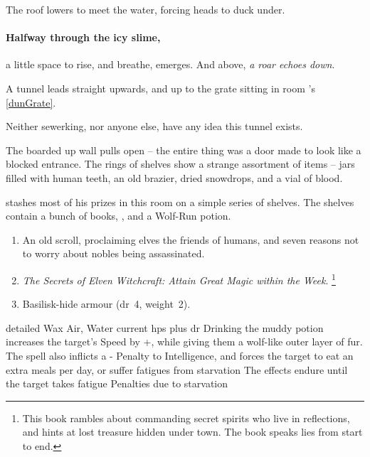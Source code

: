 The roof lowers to meet the water, forcing heads to duck under.

\paragraph{Halfway through the icy slime,}
a little space to rise, and breathe, emerges.
And above, \emph{a roar echoes down}.

A tunnel leads straight upwards, and up to the grate sitting in room 's \vref{dunGrate}.

Neither \gls{sewerking}, nor anyone else, have any idea this tunnel exists.

\begin{boxtext}
  The boarded up wall pulls open -- the entire thing was a door made to look like a blocked entrance.
  The rings of shelves show a strange assortment of items -- jars filled with human teeth, an old brazier, dried snowdrops, and a vial of blood.
\end{boxtext}


 stashes most of his prizes in this room on a simple series of shelves.
The shelves contain a bunch of books, \lootMagic, and a Wolf-Run potion.

\begin{enumerate}
  \item
  An old scroll, proclaiming elves the friends of humans, and seven reasons not to worry about nobles being assassinated.
  \item
  \textit{The Secrets of Elven Witchcraft: Attain Great Magic within the Week}.%
  \footnote{This book rambles about commanding secret spirits who live in reflections, and hints at lost treasure hidden under \gls{town}.
  The book speaks lies from start to end.}
  \item
  Basilisk-hide armour (\gls{dr}~4, \gls{weight}~2).
\end{enumerate}

\showTalisman

  {detailed}%
  {Wax}%
  {Air, Water}%
  {current \glspl{hp} plus \gls{dr}}%
  {Drinking the muddy potion increases the target's Speed by +, while giving them a wolf-like outer layer of fur.
  The spell also inflicts a - Penalty to Intelligence, and forces the target to eat an extra  meals per day, or suffer \glspl{fatigue} from starvation}%
  {
  The effects endure until the target takes \gls{fatigue} Penalties due to starvation}%
\showTalisman

